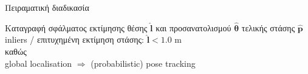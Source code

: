 \begin{frame}{Πειραματική διαδικασία}

  Καταγραφή σφάλματος εκτίμησης θέσης $\hat{\bm{l}}$ και
  προσανατολισμού $\hat{\bm{\theta}}$ τελικής στάσης $\hat{\bm{p}}$ \\

  inliers / επιτυχημένη εκτίμηση στάσης: $\hat{\bm{l}} < 1.0$ m \\

  καθώς \\

  global localisation $\Rightarrow$ (probabilistic) pose tracking


\end{frame}
